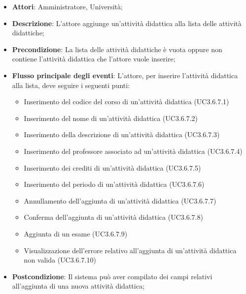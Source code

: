 \begin{itemize}
\item \textbf{Attori}: Amministratore, Università;
\item \textbf{Descrizione}: L'attore aggiunge un'attività didattica alla lista delle attività didattiche;

\item \textbf{Precondizione}: La lista delle attività didattiche è vuota oppure non contiene l'attività didattica che l'attore vuole inserire;

\item \textbf{Flusso principale degli eventi}: L'attore, per inserire l'attività didattica alla lista, deve seguire i seguenti punti:

\begin{itemize}
\item Inserimento del codice del corso di un'attività didattica (UC3.6.7.1)
\item Inserimento del nome di un’attività didattica (UC3.6.7.2)
\item Inserimento della descrizione di un'attività didattica (UC3.6.7.3)
\item Inserimento del professore associato ad un'attività didattica (UC3.6.7.4)
\item Inserimento dei crediti di un’attività didattica (UC3.6.7.5)
\item Inserimento del periodo di un’attività didattica (UC3.6.7.6)
\item Annullamento dell’aggiunta di un’attività didattica (UC3.6.7.7)
\item Conferma dell’aggiunta di un’attività didattica (UC3.6.7.8)
\item Aggiunta di un esame (UC3.6.7.9)
\item Visualizzazione dell'errore relativo all’aggiunta di un’attività didattica non valida (UC3.6.7.10)
\end{itemize}
\item \textbf{Postcondizione}: Il sistema può aver compilato dei campi relativi all'aggiunta di una nuova attività didattica;

\end{itemize}
